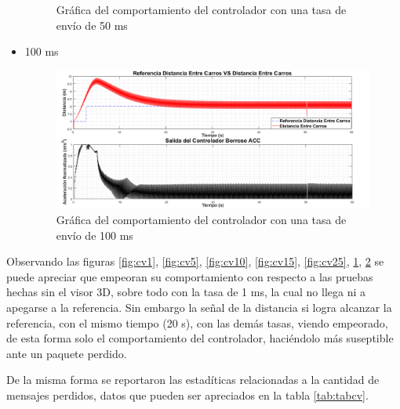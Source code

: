 \begin{itemize}
\begin{figure}[H]
		\caption{Gráfica del comportamiento del controlador con una tasa de envío de 50 ms}
		\label{fig:cv50}
\end{figure}	
\item 100 ms
\begin{figure}[H]
	\centering
		\includegraphics[scale=0.47]{Imagenes/100sv}
		\caption{Gráfica del comportamiento del controlador con una tasa de envío de 100 ms}
		\label{fig:cv100}
\end{figure}	  	  
\end{itemize}

\par Observando las figuras \ref{fig:cv1}, \ref{fig:cv5}, \ref{fig:cv10}, \ref{fig:cv15}, \ref{fig:cv25}, \ref{fig:cv50}, \ref{fig:cv100} se puede apreciar que empeoran su comportamiento con respecto a las pruebas hechas sin el visor 3D, sobre todo con la tasa de 1 ms, la cual no llega ni a apegarse a la referencia. Sin embargo la señal de la distancia si logra alcanzar la referencia, con el mismo tiempo (20 s), con las demás tasas, viendo empeorado, de esta forma solo el comportamiento del controlador, haciéndolo más suseptible ante un paquete perdido.\\      

\par De la misma forma se reportaron las estadíticas relacionadas a la cantidad de mensajes perdidos, datos que pueden ser apreciados en la tabla \ref{tab:tabcv}. 

